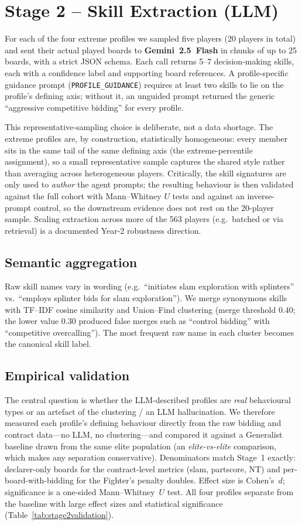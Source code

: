 \documentclass[11pt, a4paper, oneside, openany]{report}
\begin{document}
\section{Stage 2 -- Skill Extraction (LLM)}

For each of the four extreme profiles we sampled five players (20 players in
total) and sent their actual played boards to \textbf{Gemini~2.5~Flash} in
chunks of up to 25 boards, with a strict JSON schema. Each call returns 5--7
decision-making skills, each with a confidence label and supporting board
references. A profile-specific guidance prompt (\texttt{PROFILE\_GUIDANCE})
requires at least two skills to lie on the profile's defining axis; without it,
an unguided prompt returned the generic ``aggressive competitive bidding'' for
every profile.

This representative-sampling choice is deliberate, not a data shortage. The
extreme profiles are, by construction, statistically homogeneous: every member
sits in the same tail of the same defining axis (the extreme-percentile
assignment), so a small representative sample captures the shared style rather than averaging
across heterogeneous players. Critically, the skill signatures are only used to
\emph{author} the agent prompts; the resulting behaviour is then validated
against the full cohort with Mann--Whitney $U$ tests and against an
inverse-prompt control, so the downstream evidence does not rest on the 20-player
sample. Scaling extraction across more of the 563 players (e.g.\ batched or via
retrieval) is a documented Year-2 robustness direction.

\subsection*{Semantic aggregation}
Raw skill names vary in wording (e.g.\ ``initiates slam exploration with
splinters'' vs.\ ``employs splinter bids for slam exploration''). We merge
synonymous skills with TF--IDF cosine similarity and Union--Find clustering
(merge threshold $0.40$; the lower value $0.30$ produced false merges such as
``control bidding'' with ``competitive overcalling''). The most frequent raw
name in each cluster becomes the canonical skill label.

\subsection*{Empirical validation}
The central question is whether the LLM-described profiles are \emph{real}
behavioural types or an artefact of the clustering / an LLM hallucination. We
therefore measured each profile's defining behaviour directly from the raw
bidding and contract data---no LLM, no clustering---and compared it against a
Generalist baseline drawn from the same elite population (an
\emph{elite-vs-elite} comparison, which makes any separation conservative).
Denominators match Stage~1 exactly: declarer-only boards for the contract-level
metrics (slam, partscore, NT) and per-board-with-bidding for the Fighter's
penalty doubles. Effect size is Cohen's~$d$; significance is a one-sided
Mann--Whitney~$U$ test. All four profiles separate from the baseline with large
effect sizes and statistical significance (Table~\ref{tab:stage2validation}).
\end{document}
